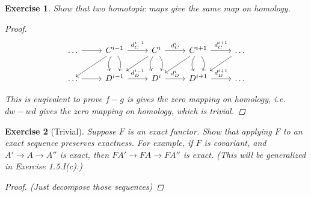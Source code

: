 \documentclass{article}
\theoremstyle{breakstyle}
\newtheorem{exercise}{Exercise}[section]
\begin{document}
\begin{exercise}
Show that two homotopic maps give the same map on homology.

\begin{proof}
    $$
    \begin{tikzcd}
    \ldots \arrow[r] & C^{i-1} \arrow[r, "d_{C}^{i-1}"] \arrow[d, bend right] \arrow[d, bend left] \arrow[ld] & C^{i} \arrow[r, "d_{C}^{i}"] \arrow[d, bend right] \arrow[d, bend left] \arrow[ld] & C^{i+1} \arrow[r, "d_{C}^{i+1}"] \arrow[d, bend right] \arrow[d, bend left] \arrow[ld] & \ldots \arrow[ld] \\
    \ldots \arrow[r] & D^{i-1} \arrow[r, "d_{D}^{i-1}"]                                                       & D^{i} \arrow[r, "d_{D}^{i}"]                                                       & D^{i+1} \arrow[r, "d_{D}^{i+1}"]                                                       & \ldots           
    \end{tikzcd}
    $$
    
    This is euqivalent to prove $f-g$ is gives the zero mapping on homology,
    i.e. $dw-wd$ gives the zero mapping on homology, which is trivial.
\end{proof}

\end{exercise}

\begin{exercise}[Trivial]
Suppose $F$ is an exact functor. Show that applying $F$ to an exact
sequence preserves exactness. For example, if $F$ is covariant, and
$A' \rightarrow A \rightarrow A''$ is exact, then $FA' \rightarrow FA
\rightarrow FA''$ is exact. (This will be generalized in Exercise 1.5.I(c).)

\begin{proof}
    \emph{(Just decompose those sequences)}
\end{proof}

\end{exercise}
\end{document}
